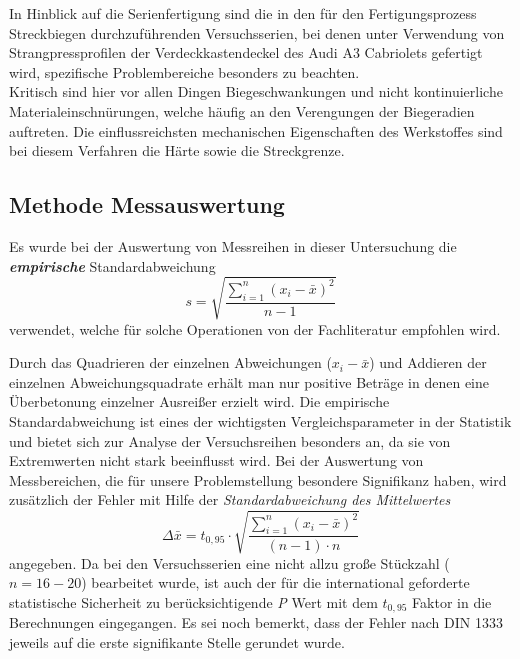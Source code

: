 \documentclass[12pt,a4paper,parskip,twoside,BCOR5mm,headsepline]{scrartcl}
\begin{document}
In Hinblick auf die Serienfertigung sind die in den für den Fertigungsprozess  Streckbiegen durchzuführenden Versuchsserien, bei denen unter Verwendung von Strangpressprofilen der Verdeckkastendeckel des Audi A3 Cabriolets gefertigt wird, spezifische Problembereiche besonders zu beachten.\\
Kritisch sind hier vor allen Dingen Biegeschwankungen und nicht kontinuierliche Materialeinschnürungen,  welche häufig an den Verengungen der Biegeradien auftreten. Die einflussreichsten mechanischen Eigenschaften des Werkstoffes sind bei diesem Verfahren die Härte sowie die Streckgrenze.














  











\subsection{Methode Messauswertung}
Es wurde bei der Auswertung von Messreihen in dieser Untersuchung  die \textbf{\emph{empirische}} Standardabweichung 
\begin{equation}
 s= \sqrt{\frac{\sum \limits_{i=1}^n (x_i - \bar{x})^2}{n-1}} 
\end{equation}  verwendet, welche für solche Operationen von der Fachliteratur empfohlen wird.\autocite[301]{mf} 

Durch das Quadrieren der einzelnen Abweichungen ($ x_i-\bar{x}$) und Addieren der einzelnen Abweichungsquadrate erhält man nur positive Beträge in denen eine Überbetonung einzelner Ausreißer erzielt wird.
Die empirische Standardabweichung ist   eines der wichtigsten Vergleichsparameter in der Statistik und bietet sich zur Analyse der Versuchsreihen besonders an, da sie von Extremwerten nicht stark beeinflusst wird.\autocite[54]{gst} Bei der Auswertung von Messbereichen, die für unsere Problemstellung besondere Signifikanz haben, wird zusätzlich der Fehler mit Hilfe der  \emph{Standardabweichung des Mittelwertes }  \begin{equation} \Delta\bar{x}= t_{0,95} \cdot \sqrt{\frac{\sum \limits_{i=1}^n (x_i - \bar{x})^2}{(n-1)\cdot n}}\end{equation}  angegeben.\autocite[16]{ph} Da bei den Versuchsserien eine nicht allzu große Stückzahl ($ n=16-20 $) bearbeitet wurde,  ist auch der für die international geforderte statistische Sicherheit zu berücksichtigende \emph{P} Wert mit dem $ t_{0,95} $ Faktor in die Berechnungen eingegangen.\autocite[609]{tp}  Es sei noch bemerkt, dass der Fehler nach DIN 1333 jeweils auf die erste signifikante Stelle gerundet wurde. \autocite[612]{tp}
 	 	
\end{document}
